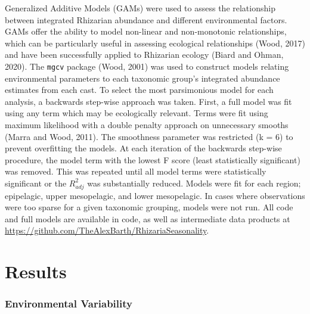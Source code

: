 \documentclass[
]{article}
\begin{document}
Generalized Additive Models (GAMs) were used to assess the relationship
between integrated Rhizarian abundance and different environmental
factors. GAMs offer the ability to model non-linear and non-monotonic
relationships, which can be particularly useful in assessing ecological
relationships (Wood, 2017) and have been successfully applied to
Rhizarian ecology (Biard and Ohman, 2020). The \texttt{mgcv} package
(Wood, 2001) was used to construct models relating environmental
parameters to each taxonomic group's integrated abundance estimates from
each cast. To select the most parsimonious model for each analysis, a
backwards step-wise approach was taken. First, a full model was fit
using any term which may be ecologically relevant. Terms were fit using
maximum likelihood with a double penalty approach on unnecessary smooths
(Marra and Wood, 2011). The smoothness parameter was restricted (k = 6)
to prevent overfitting the models. At each iteration of the backwards
step-wise procedure, the model term with the lowest F score (least
statistically significant) was removed. This was repeated until all
model terms were statistically significant or the \(R^2_{adj}\) was
substantially reduced. Models were fit for each region; epipelagic,
upper mesopelagic, and lower mesopelagic. In cases where observations
were too sparse for a given taxonomic grouping, models were not run. All
code and full models are available in code, as well as intermediate data
products at \url{https://github.com/TheAlexBarth/RhizariaSeasonality}.

\hypertarget{results}{%
\section{Results}\label{results}}

\hypertarget{environmental-variability}{%
\subsubsection{Environmental
Variability}\label{environmental-variability}}
\end{document}
